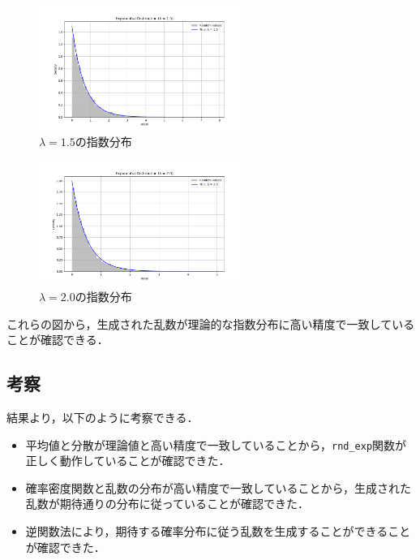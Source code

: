 \documentclass[fleqn, a4paper. 12pt]{jsarticle}
\begin{document}
    \begin{figure}[!h]
      \centering
      \includegraphics[width=0.6\textwidth]{lambda_1.5_plot.png}
      \caption{ $\lambda = 1.5$の指数分布}
      \label{fig:2}
    \end{figure}

    \begin{figure}[!h]
      \centering
      \includegraphics[width=0.6\textwidth]{lambda_2.0_plot.png}
      \caption{ $\lambda = 2.0$の指数分布}
      \label{fig:3}
    \end{figure}

    これらの図から，生成された乱数が理論的な指数分布に高い精度で一致していることが確認できる．

    \subsection*{考察}

      結果より，以下のように考察できる．

    \begin{itemize}
        \item 平均値と分散が理論値と高い精度で一致していることから，\texttt{rnd\_exp}関数が正しく動作していることが確認できた．
        \item 確率密度関数と乱数の分布が高い精度で一致していることから，生成された乱数が期待通りの分布に従っていることが確認できた．
        \item 逆関数法により，期待する確率分布に従う乱数を生成することができることが確認できた．
    \end{itemize}
\end{document}
